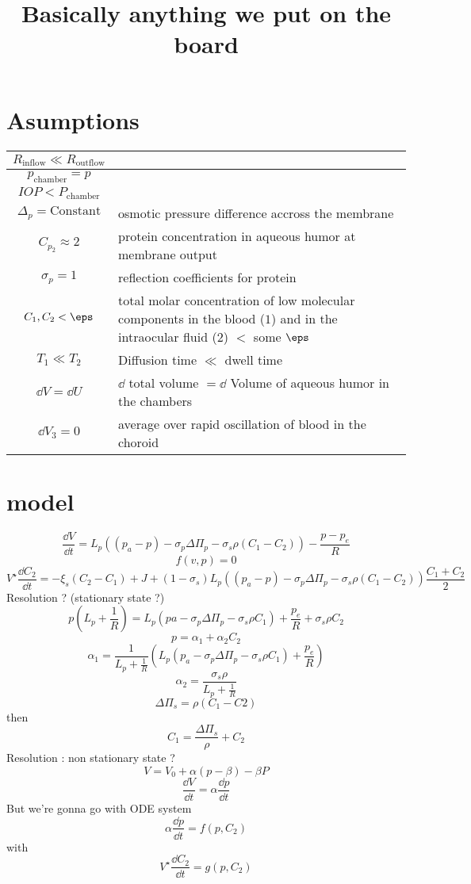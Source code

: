 \documentclass[11pt]{article}
\author{}
\title{Basically anything we put on the board}
\date{}
\begin{document}
\maketitle
\section{Asumptions}
\begin{center}
\begin{tabular}{|c|p{}|}
\hline
$R_{\mathrm{inflow}} \ll R_{\mathrm{outflow}}$&\\
\hline
$p_{\mathrm{chamber}} = p$&\\
\hline
$IOP < P_{\mathrm{chamber}}$&\\
\hline
$\Delta_p = \mathrm{Constant}$&osmotic pressure difference accross the membrane\\
\hline
$C_{p_2} \approx 2$ &protein concentration in aqueous humor at membrane output \\
\hline
$\sigma_p = 1 $ &reflection coefficients for protein\\
\hline
$C_1,C_2 < \eps$ & total molar concentration of low molecular components in the blood ($1$) and in the intraocular fluid ($2$) $<$ some  $\eps$\\
\hline
$T_1 \ll T_2$ & Diffusion time $\ll$ dwell time \\
\hline
$\dd V = \dd U$ & $\dd$ total volume $= \dd$ Volume of aqueous humor in the chambers \\
\hline
$\dd V_3 =0 $ & average over rapid oscillation of blood in the choroid\\
\hline
\end{tabular}
\end{center}


\section{model}
\[
\frac{\dd V}{\dd t} = L_{p} \left( (p_{a} -p) - \sigma_{p} \Delta \Pi_{p} - \sigma_{s} \rho (C_{1}- C_{2}) \right) - \frac{p - p_{e} }{R}
\]
\[
f(v,p) = 0
\]
\[
V^\star \frac{\dd C_2}{\dd t} = - \xi_s (C_2-C_1) + J + \left(1- \sigma_s\right)L_p\left((p_a-p) - \sigma_p \Delta \Pi_p - \sigma_s \rho (C_1-C_2) \right) \frac{C_1 + C_2}{2}
\]
Resolution ? (stationary state ?)
\[
p\left( L_p + \frac{1}{R} \right) = L_p \left(pa - \sigma_p \Delta \Pi_p - \sigma_s \rho C_1\right) + \frac{p_e}{R} + \sigma_s \rho C_2
\]
\[
p = \alpha_1 + \alpha_2 C_2
\]
\[
\alpha_1 = \frac{1}{L_p + \frac{1}{R}} \left( L_p \left( p_a - \sigma_p \Delta \Pi_p - \sigma_s \rho C_1 \right) + \frac{p_e}{R}\right)
\]
\[
\alpha_2 = \frac{\sigma_s \rho}{L_p + \frac{1}{R}}
\]
\[
\Delta \Pi_s = \rho (C_1 - C2)
\]
then 
\[
C_1 = \frac{\Delta \Pi_s}{\rho} + C_2
\]
Resolution : non stationary state ? 
\[
V = V_0 + \alpha (p - \beta ) - \beta P
\]
\[
\frac{\dd V}{\dd t}= \alpha \frac{\dd p}{\dd t}
\]
But we're gonna go with ODE system
\[
\alpha \frac{\dd p}{\dd t} = f(p, C_2)
\]
with
\[
V^\star \frac{\dd C_2}{\dd t} = g(p, C_2)
\]
\end{document}
